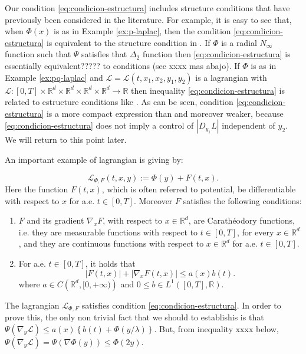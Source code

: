 \documentclass[twoside]{article}
\makeatletter
\theoremstyle{remark}
\newcommand{\labitem}[2]{%
\def\@itemlabel{\textbf{#1}}
\item
\def\@currentlabel{#1}\label{#2}}
\newcommand{\rr}{\mathbb{R}}
\renewcommand{\leq}{\leqslant}
\newcounter{example}[section]
\makeatother
\begin{document}
Our condition \eqref{eq:condicion-estructura} includes structure conditions that have previously been considered in the literature. For example, it is easy to see that, when $\Phi(x)$ is as in Example \ref{ex:p-laplac}, then  the condition \eqref{eq:condicion-estructura}  is equivalent to the structure condition in  \cite[Th. 1.4]{mawhin2010critical}.  If $\Phi$ is a radial $N_{\infty}$ function such that $\Psi$ satisfies that $\Delta_2$ function  then \eqref{eq:condicion-estructura} is essentially equivalent????? to conditions  \cite[Eq. (2)-(4)]{ABGMS2015} (see xxxx mas abajo).   If $\Phi$ is as in Example \ref{ex:pq-laplac} and $\mathcal{L}=\mathcal{L}(t,x_1,x_2,y_1,y_2)$ is a lagrangian with $\mathcal{L}:[0,T]\times\rr^d\times\rr^d\times\rr^d\times\rr^d\to\rr$ then inequality \eqref{eq:condicion-estructura} is related to estructure conditions like
\cite[Lemma 3.1, Eq. (3.1)]{Tian2007192}. As can be seen, condition \eqref{eq:condicion-estructura} is a more compact expression than \cite[Lemma 3.1, Eq. (3.1)]{Tian2007192} and moreover   weaker, because  \eqref{eq:condicion-estructura} does not imply a control of
$|D_{y_1}L|$ independent of $y_2$.  We will return to this point later.


An important example of lagrangian  is giving by:

\begin{equation}\label{eq:lagrange_phi}
\mathcal{L}_{\Phi,F}(t,x,y):=\Phi(y)+F(t,x).
\end{equation}
Here the function $F(t,x)$, which is often referred to potential,  be differentiable with respect to $x$ for a.e. $t\in [0,T]$. Moreover $F$ satisfies the following conditions:
\begin{enumerate}
\labitem{(C)}{item:condicion_c} $F$ and its gradient $\nabla_x F$, with respect to $x\in\rr^d$,  are  Carath\'eodory functions, i.e. they are measurable functions with respect to $t\in [0,T]$, for every  $x\in\rr^d$, and they are continuous functions with  respect to  $x\in\rr^d$ for a.e. $t \in [0,T]$.
 \labitem{(A)}{item:condicion_a}  For   a.e. $t\in [0,T]$, it holds that
\begin{equation}\label{eq:phi-lagrange}
|F(t,x)| + |\nabla_x F(t,x)|  \leq a(x)b(t).
\end{equation}
where  $a\in C\left(\rr^d,[0,+\infty)\right)$ and $0\leq b\in L^1([0,T],\rr)$.
\end{enumerate}

The lagrangian $\mathcal{L}_{\Phi,F}$ satisfies condition  \eqref{eq:condicion-estructura}. In order to prove this, the only non trivial fact that we should to establishis is that $ \Psi(\nabla_{y}\mathcal{L})
\leq
a(x)\left\{b(t)+ \Phi\left({y}/{\lambda}\right)\right\}$. But, from inequality xxxx below, 
$\Psi(\nabla_{y}\mathcal{L})=\Psi\left(\nabla\Phi(y)\right)\leq \Phi(2y)$.
\end{document}

